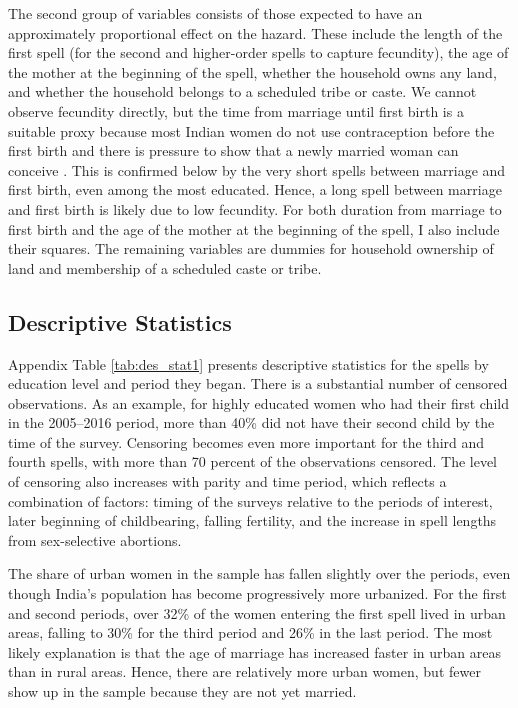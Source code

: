 \documentclass[12pt,letterpaper]{article}
\begin{document}
The second group of variables consists of those expected to have an 
approximately proportional effect on the hazard.
These include the length of the first spell 
(for the second and higher-order spells to capture fecundity), 
the age of the mother at the beginning of the spell, 
whether the household owns any land, 
and whether the household belongs to a scheduled tribe or caste.
We cannot observe fecundity directly, but the time from marriage until 
first birth is a suitable proxy because most Indian women do not use 
contraception before the first birth and there is pressure to show that 
a newly married woman can conceive \citep{dyson83,Sethuraman2007,Dommaraju2009}.
This is confirmed below by the very short spells between marriage and first birth,
even among the most educated.
Hence, a long spell between marriage and first birth is likely due to low fecundity.
For both duration from marriage to first birth and the age of the mother at the 
beginning of the spell, I also include their squares.
The remaining variables are dummies for household ownership of land and membership
of a scheduled caste or tribe.


\subsection{Descriptive Statistics}

Appendix Table \ref{tab:des_stat1} presents descriptive statistics for
the spells by education level and period they began.
There is a substantial number of censored observations.
As an example, for highly educated women who had their first child in the 2005--2016
period, more than 40\% did not have their second child by the time of the survey.
Censoring becomes even more important for the third and fourth
spells, with more than 70 percent of the observations censored.
The level of censoring also increases with parity and time period,
which reflects a combination of factors: timing of the surveys
relative to the periods of interest, later beginning of childbearing, 
falling fertility, and the increase in spell lengths from 
sex-selective abortions.

The share of urban women in the sample has fallen slightly over the
periods, even though India's population has become progressively more urbanized.
For the first and second periods, over 32\% of the women 
entering the first spell lived in urban areas, falling to 
30\% for the third period and 26\% in the last period.
The most likely explanation is that the age of marriage has increased
faster in urban areas than in rural areas.
Hence, there are relatively more urban women, but fewer show up in the
sample because they are not yet married.
\end{document}
